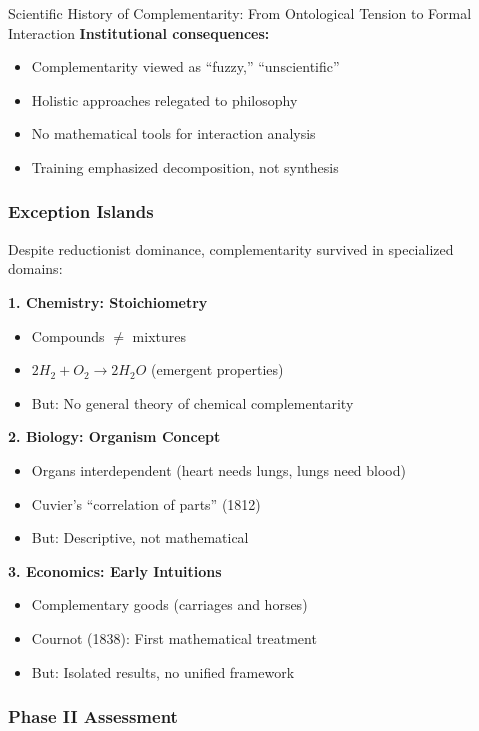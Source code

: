 \begin{chapter}{Scientific History of Complementarity: From Ontological Tension to Formal Interaction}
\textbf{Institutional consequences:}
\begin{itemize}[noitemsep]
    \item Complementarity viewed as ``fuzzy,'' ``unscientific''
    \item Holistic approaches relegated to philosophy
    \item No mathematical tools for interaction analysis
    \item Training emphasized decomposition, not synthesis
\end{itemize}

\subsubsection{Exception Islands}

Despite reductionist dominance, complementarity survived in specialized domains:

\textbf{1. Chemistry: Stoichiometry}
\begin{itemize}[noitemsep]
    \item Compounds $\neq$ mixtures
    \item $2H_2 + O_2 \to 2H_2O$ (emergent properties)
    \item But: No general theory of chemical complementarity
\end{itemize}

\textbf{2. Biology: Organism Concept}
\begin{itemize}[noitemsep]
    \item Organs interdependent (heart needs lungs, lungs need blood)
    \item Cuvier's ``correlation of parts'' (1812)
    \item But: Descriptive, not mathematical
\end{itemize}

\textbf{3. Economics: Early Intuitions}
\begin{itemize}[noitemsep]
    \item Complementary goods (carriages and horses)
    \item Cournot (1838): First mathematical treatment
    \item But: Isolated results, no unified framework
\end{itemize}

\subsubsection{Phase II Assessment}


\end{chapter}
